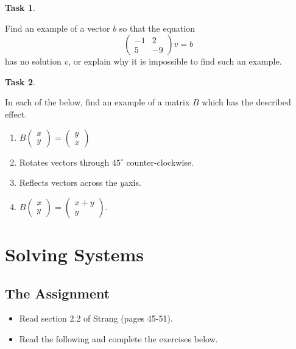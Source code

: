 \documentclass[10pt,]{book}
\theoremstyle{plain}
\theoremstyle{definition}
\numberwithin{equation}{section}
\newtheorem{task}{Task}[chapter]
\begin{document}
\begin{task}
\label{task-36}

        Find an example of a vector \(b\) so that the equation\[
          \begin{pmatrix} -1 & 2 \\ 5 & -9 \end{pmatrix} v = b
        \]
        has no solution \(v\), or explain why it is impossible to find
        such an example.
      \end{task}
\begin{task}
\label{task-37}

        In each of the below, find an example of a matrix \(B\) which has the
        described effect.
        \begin{enumerate}
\item{}
            \(
              B\begin{pmatrix} x \\ y \end{pmatrix} = \begin{pmatrix}y \\ x \end{pmatrix}
            \)
          \item{}
            Rotates vectors through \(45^{\circ}\) counter-clockwise.
          \item{}
            Reflects vectors across the \(y\)axis.
          \item{}
            \(
              B\begin{pmatrix} x \\ y \end{pmatrix} =
              \begin{pmatrix} x+y \\ y \end{pmatrix}.
            \)
          \end{enumerate}
\end{task}
\clearpage
\typeout{************************************************}
\typeout{************************************************}
\section[Solving Systems]{Solving Systems}\label{elimination}
\typeout{************************************************}
\typeout{************************************************}
\subsection[The Assignment]{The Assignment}\label{subsection-24}
\begin{itemize}
\item{}Read section 2.2 of Strang (pages 45-51).\item{}Read the following and complete the exercises below.\end{itemize}
\typeout{************************************************}
\typeout{************************************************}
\end{document}
